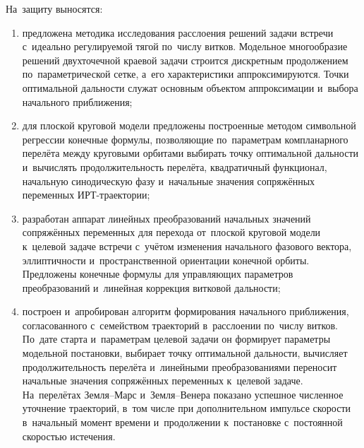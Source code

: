 На~защиту выносятся:
\begin{enumerate}[beginpenalty=10000]
    \item предложена методика исследования расслоения решений задачи встречи с~идеально регулируемой тягой по~числу витков. Модельное многообразие решений двухточечной краевой задачи строится дискретным продолжением по~параметрической сетке, а~его характеристики аппроксимируются. Точки оптимальной дальности служат основным объектом аппроксимации и~выбора начального приближения;

    \item для плоской круговой модели предложены построенные методом символьной регрессии конечные формулы, позволяющие по~параметрам компланарного перелёта между круговыми орбитами выбирать точку оптимальной дальности и~вычислять продолжительность перелёта, квадратичный функционал, начальную синодическую фазу и~начальные значения сопряжённых переменных ИРТ-траектории;

    \item разработан аппарат линейных преобразований начальных значений сопряжённых переменных для перехода от~плоской круговой модели к~целевой задаче встречи с~учётом изменения начального фазового вектора, эллиптичности и~пространственной ориентации конечной орбиты. Предложены конечные формулы для управляющих параметров преобразований и~линейная коррекция витковой дальности;

    \item построен и~апробирован алгоритм формирования начального приближения, согласованного с~семейством траекторий в~расслоении по~числу витков. По~дате старта и~параметрам целевой задачи он формирует параметры модельной постановки, выбирает точку оптимальной дальности, вычисляет продолжительность перелёта и~линейными преобразованиями переносит начальные значения сопряжённых переменных к~целевой задаче. На~перелётах Земля--Марс и~Земля--Венера показано успешное численное уточнение траекторий, в~том числе при дополнительном импульсе скорости в~начальный момент времени и~продолжении к~постановке с~постоянной скоростью истечения.
\end{enumerate}

